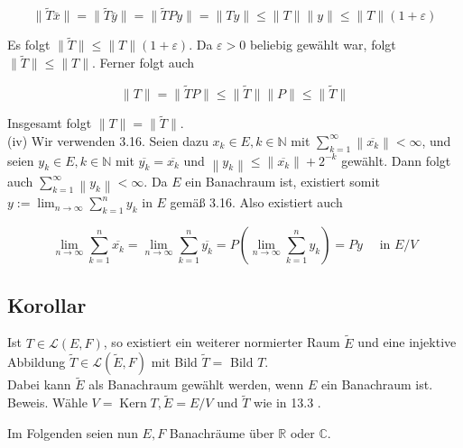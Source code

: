 \documentclass[10pt, letterpaper]{article}
\begin{document}
$$
\|\tilde{T} \bar{x}\|=\|\tilde{T} \bar{y}\|=\|\tilde{T} P y\|=\|T y\| \leq\|T\|\|y\| \leq\|T\|(1+\varepsilon)
$$

Es folgt $\|\tilde{T}\| \leq\|T\|(1+\varepsilon)$. Da $\varepsilon>0$ beliebig gewählt war, folgt $\|\tilde{T}\| \leq\|T\|$. Ferner folgt auch

$$
\|T\|=\|\tilde{T} P\| \leq\|\tilde{T}\|\|P\| \leq\|\tilde{T}\|
$$

Insgesamt folgt $\|T\|=\|\tilde{T}\|$.\\
(iv) Wir verwenden 3.16. Seien dazu $x_{k} \in E, k \in \mathbb{N}$ mit $\sum_{k=1}^{\infty}\left\|\overline{x_{k}}\right\|<\infty$, und seien $y_{k} \in E, k \in \mathbb{N}$ mit $\overline{y_{k}}=\overline{x_{k}}$ und $\left\|y_{k}\right\| \leq\left\|\overline{x_{k}}\right\|+2^{-k}$ gewählt. Dann folgt auch $\sum_{k=1}^{\infty}\left\|y_{k}\right\|<\infty$. Da $E$ ein Banachraum ist, existiert somit $y:=\lim _{n \rightarrow \infty} \sum_{k=1}^{n} y_{k}$ in $E$ gemäß 3.16. Also existiert auch

$$
\lim _{n \rightarrow \infty} \sum_{k=1}^{n} \overline{x_{k}}=\lim _{n \rightarrow \infty} \sum_{k=1}^{n} \overline{y_{k}}=P\left(\lim _{n \rightarrow \infty} \sum_{k=1}^{n} y_{k}\right)=P y \quad \text { in } E / V
$$

\subsection*{Korollar}
Ist $T \in \mathcal{L}(E, F)$, so existiert ein weiterer normierter Raum $\tilde{E}$ und eine injektive Abbildung $\tilde{T} \in \mathcal{L}(\tilde{E}, F)$ mit Bild $\tilde{T}=$ Bild $T$.\\
Dabei kann $\tilde{E}$ als Banachraum gewählt werden, wenn $E$ ein Banachraum ist.\\
Beweis. Wähle $V=\operatorname{Kern} T, \tilde{E}=E / V$ und $\tilde{T}$ wie in 13.3 .

Im Folgenden seien nun $E, F$ Banachräume über $\mathbb{R}$ oder $\mathbb{C}$.
\end{document}
